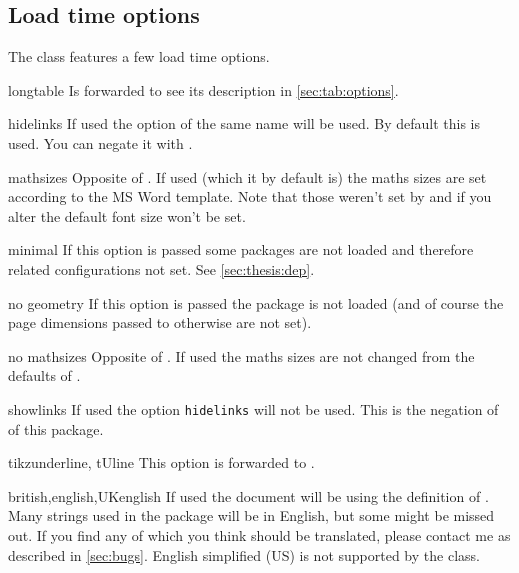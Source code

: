 \subsection{Load time options}\label{sec:thesis:opt}%
The class features a few load time options.
\begin{describeopt}{longtable}
  Is forwarded to  see its description in \autoref{sec:tab:options}.
\end{describeopt}
\begin{describeopt}{hidelinks}
  If used the  option of the same name will be used. By default
  this is used. You can negate it with .
\end{describeopt}
\begin{describeopt}{mathsizes}
  Opposite of . If used (which it by default is) the maths
  sizes are set according to the MS Word template. Note that those weren't set
  by  and if you alter the default font size won't be set.
\end{describeopt}
\begin{describeopt}{minimal}
  If this option is passed some packages are not loaded and therefore related
  configurations not set. See \autoref{sec:thesis:dep}.
\end{describeopt}
\begin{describeopt}{no geometry}
  If this option is passed the  package is not loaded (and of
  course the page dimensions passed to  otherwise are not set).
\end{describeopt}
\begin{describeopt}{no mathsizes}
  Opposite of . If used the maths sizes are not changed from the
  defaults of .
\end{describeopt}
\begin{describeopt}{showlinks}
  If used the  option \verb|hidelinks| will not be used. This is
  the negation of  of this package.
\end{describeopt}
\begin{describeopt}{tikzunderline, tUline}
  This option is forwarded to .
\end{describeopt}
\begin{describeopt}{british,english,UKenglish}
  If used the document will be using the  definition of
  . Many strings used in the package will be in English, but some
  might be missed out. If you find any of which you think should be translated,
  please contact me as described in \autoref{sec:bugs}. English simplified (US)
  is not supported by the class.
\end{describeopt}
